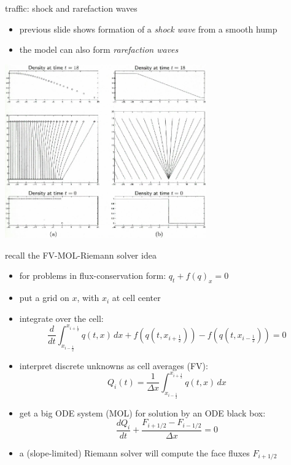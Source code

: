 \documentclass[10pt,dvipsnames,usepdftitle=false,
hyperref={pdftitle = {Finite volume methods},
    pdfauthor = {Ed Bueler}}]{beamer}
\newcommand{\xiphalf}{{x_{i+\frac{1}{2}}}}
\newcommand{\ximhalf}{{x_{i-\frac{1}{2}}}}
\begin{document}
\begin{frame}{traffic: shock and rarefaction waves}

\begin{itemize}
\item previous slide shows formation of a \emph{shock wave} from a smooth hump
\item the model can also form \emph{rarefaction waves}
\end{itemize}

\begin{center}
\includegraphics[width=0.65\textwidth]{figs/leveque11p3}
\end{center}
\end{frame}


\begin{frame}{recall the FV-MOL-Riemann solver idea}

\begin{itemize}
\item for problems in flux-conservation form: \quad $q_t + f(q)_x = 0$
\item put a grid on $x$, with $x_i$ at cell center
\item integrate over the cell:
    $$\frac{d}{dt} \int_\ximhalf^\xiphalf q(t,x) \,dx + f\left(q(t,\xiphalf)\right) - f\left(q(t,\ximhalf)\right) = 0$$
\item interpret discrete unknowns as cell averages (FV):
    $$Q_i(t) = \frac{1}{\Delta x} \int_\ximhalf^\xiphalf q(t,x)\,dx$$
\item get a big ODE system (MOL) for solution by an ODE black box:
    $$\frac{dQ_i}{dt} + \frac{F_{i+1/2} - F_{i-1/2}}{\Delta x} = 0$$
\item a (slope-limited) Riemann solver will compute the face fluxes $F_{i+1/2}$
\end{itemize}
\end{frame}
\end{document}
